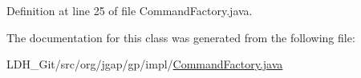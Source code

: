 Definition at line 25 of file Command\-Factory.\-java.



The documentation for this class was generated from the following file\-:\begin{DoxyCompactItemize}
\item 
L\-D\-H\-\_\-\-Git/src/org/jgap/gp/impl/\hyperlink{_command_factory_8java}{Command\-Factory.\-java}\end{DoxyCompactItemize}
